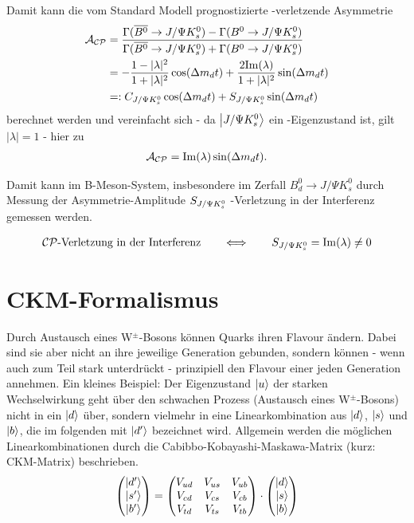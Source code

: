 Damit kann die vom Standard Modell prognostizierte \CP-verletzende Asymmetrie 
\begin{align}
\mathcal{A}_{\text{$\mathcal{CP}$}} &= \frac{\Gamma (\overline{B^0} \rightarrow J/\Psi K_s^0) - \Gamma (B^0 \rightarrow J/\Psi K_s^0)}{\Gamma (\overline{B^0} \rightarrow J/\Psi K_s^0) + \Gamma (B^0 \rightarrow J/\Psi K_s^0)} \\
&= -\frac{1-|\lambda|^2}{1+|\lambda|^2}\cos(\Delta m_d t) + \frac{2\mathrm{Im}(\lambda)}{1+|\lambda|^2}\sin(\Delta m_d t) \\
&=: C_{J/\Psi K_s^0} \cos(\Delta m_d t) + S_{J/\Psi K_s^0} \sin(\Delta m_d t)
\end{align}
berechnet werden und vereinfacht sich - da $\Ket{J/\Psi K_s^0}$ ein \CP-Eigenzustand ist, gilt $|\lambda| = 1$ - hier zu
\begin{align}
\mathcal{A}_{\text{$\mathcal{CP}$}} = \mathrm{Im}(\lambda)\sin(\Delta m_d t) .
\end{align}

Damit kann im B-Meson-System, insbesondere im Zerfall $B_d^0 \rightarrow J/\Psi K_s^0$ durch Messung der Asymmetrie-Amplitude $S_{J/\Psi K_s^0}$ \CP-Verletzung in der Interferenz gemessen werden.

\begin{align}
\text{$\mathcal{CP}$-Verletzung in der Interferenz} \qquad \Longleftrightarrow \qquad S_{J/\Psi K_s^0} = \mathrm{Im}(\lambda)\neq 0
\end{align}

\section{CKM-Formalismus}
Durch Austausch eines W$^{\pm}$-Bosons können Quarks ihren Flavour ändern. Dabei sind sie aber nicht an ihre jeweilige Generation gebunden, sondern können - wenn auch zum Teil stark unterdrückt - prinzipiell den Flavour einer jeden Generation annehmen. Ein kleines Beispiel: Der Eigenzustand $\Ket{u}$ der starken Wechselwirkung geht über den schwachen Prozess (Austausch eines W$^{\pm}$-Bosons) nicht in ein $\Ket{d}$ über, sondern vielmehr in eine Linearkombination aus $\Ket{d}$, $\Ket{s}$ und $\Ket{b}$, die im folgenden mit $\Ket{d'}$ bezeichnet wird. Allgemein werden die möglichen Linearkombinationen durch die Cabibbo-Kobayashi-Maskawa-Matrix (kurz: CKM-Matrix) beschrieben.
\begin{align}
\begin{pmatrix}
\Ket{d'} \\ \Ket{s'} \\ \Ket{b'}
\end{pmatrix}
=
\begin{pmatrix}
V_{ud} & V_{us} & V_{ub} \\
V_{cd} & V_{cs} & V_{cb} \\
V_{td} & V_{ts} & V_{tb} \\
\end{pmatrix}
\cdot
\begin{pmatrix}
\Ket{d} \\ \Ket{s} \\ \Ket{b}
\end{pmatrix}
\end{align}

